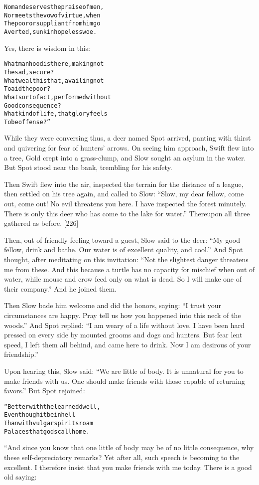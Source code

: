 \documentclass{article}
\renewenvironment{verbatim}{\begin{alltt}\normalfont\begin{centering}}{\end{centering}\end{alltt}}
\begin{document}
\begin{verbatim}
No man deserves the praise of men,
Nor meets the vow of virtue, when
The poor or suppliant from him go
Averted, sunk in hopeless woe.
\end{verbatim}
Yes, there is wisdom in this:

\begin{verbatim}
What manhood is there, making not
    The sad, secure?
What wealth is that, availing not
    To aid the poor?
What sort of act, performed without
    Good consequence?
What kind of life, that glory feels
    To be offense?”
\end{verbatim}
While they were conversing thus, a deer named Spot arrived, panting
with thirst and quivering for fear of hunters' arrows. On seeing
him approach, Swift flew into a tree, Gold crept into a
grass-clump, and Slow sought an asylum in the water. But Spot stood
near the bank, trembling for his safety.

Then Swift flew into the air, inspected the terrain for the
distance of a league, then settled on his tree again, and called to
Slow:
``Slow, my dear fellow, come out, come out! No evil threatens you here. I have inspected the forest minutely. There is only this deer who has come to the lake for water.''
Thereupon all three gathered as before. [226]

Then, out of friendly feeling toward a guest, Slow said to the
deer:
``My good fellow, drink and bathe. Our water is of excellent quality, and cool.''
And Spot thought, after meditating on this invitation:
``Not the slightest danger threatens me from these. And this because a turtle has no capacity for mischief when out of water, while mouse and crow feed only on what is dead. So I will make one of their company.''
And he joined them.

Then Slow bade him welcome and did the honors, saying:
``I trust your circumstances are happy. Pray tell us how you happened into this neck of the woods.''
And Spot replied:
``I am weary of a life without love. I have been hard pressed on every side by mounted grooms and dogs and hunters. But fear lent speed, I left them all behind, and came here to drink. Now I am desirous of your friendship.''

Upon hearing this, Slow said:
``We are little of body. It is unnatural for you to make friends with us. One should make friends with those capable of returning favors.''
But Spot rejoined:

\begin{verbatim}
“Better with the learned dwell,
Even though it be in hell
Than with vulgar spirits roam
Palaces that gods call home.
\end{verbatim}
“And since you know that one little of body may be of no little
consequence, why these self-depreciatory remarks? Yet after all,
such speech is becoming to the excellent. I therefore insist that
you make friends with me today. There is a good old saying:
\end{document}

